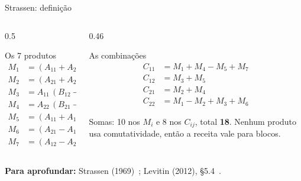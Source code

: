 \documentclass[aspectratio=169,xcolor=table]{beamer}
\newcommand{\fonte}[1]{%
  \vfill
  {\tiny\color{gray!55!black}\textbf{Para aprofundar:} #1\par}%
}
\begin{document}
\begin{frame}{Strassen: definição}
  \begin{columns}[T]
    \begin{column}{0.5\textwidth}
      \begin{block}{Os 7 produtos}
        \scriptsize
        \vspace{-4pt}
        \[
          \begin{aligned}
            M_1 &= (A_{11}+A_{22})(B_{11}+B_{22})\\
            M_2 &= (A_{21}+A_{22})\,B_{11}\\
            M_3 &= A_{11}\,(B_{12}-B_{22})\\
            M_4 &= A_{22}\,(B_{21}-B_{11})\\
            M_5 &= (A_{11}+A_{12})\,B_{22}\\
            M_6 &= (A_{21}-A_{11})(B_{11}+B_{12})\\
            M_7 &= (A_{12}-A_{22})(B_{21}+B_{22})
          \end{aligned}
        \]
      \end{block}
    \end{column}
    \begin{column}{0.46\textwidth}
      \begin{block}{As combinações}
        \scriptsize
        \vspace{-4pt}
        \[
          \begin{aligned}
            C_{11} &= M_1 + M_4 - M_5 + M_7\\
            C_{12} &= M_3 + M_5\\
            C_{21} &= M_2 + M_4\\
            C_{22} &= M_1 - M_2 + M_3 + M_6
          \end{aligned}
        \]
      \end{block}
      \scriptsize Somas: 10 nos $M_i$ e 8 nos $C_{ij}$, total \textbf{18}.
      Nenhum produto usa comutatividade, então a receita vale para blocos.
    \end{column}
  \end{columns}
  \fonte{Strassen (1969)~\cite{strassen1969gaussian};
    Levitin (2012), \S 5.4~\cite{levitin2012introduction}.}
\end{frame}
\end{document}
